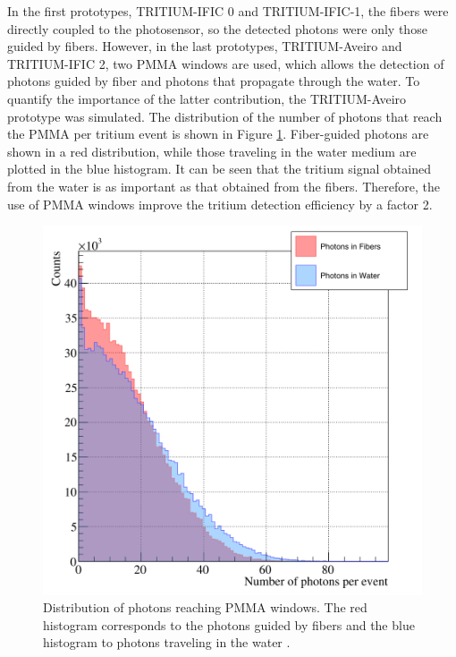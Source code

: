 In the first prototypes, TRITIUM-IFIC 0 and TRITIUM-IFIC-1, the fibers were directly coupled to the photosensor, so the detected photons were only those guided by fibers. However, in the last prototypes, TRITIUM-Aveiro and TRITIUM-IFIC 2, two PMMA windows are used, which allows the detection of photons guided by fiber and photons that propagate through the water. To quantify the importance of the latter contribution, the TRITIUM-Aveiro prototype was simulated. The distribution of the number of photons that reach the PMMA per tritium event is shown in Figure \ref{fig:PMMAEffect}. Fiber-guided photons are shown in a red distribution, while those traveling in the water medium are plotted in the blue histogram. It can be seen that the tritium signal obtained from the water is as important as that obtained from the fibers. Therefore, the use of PMMA windows improve the tritium detection efficiency by a factor 2.

\begin{figure}[hbtp]
\centering
\includegraphics[scale=0.3]{Figures/8SimulationsResults/81TRITIUMDesign/815PMMA/PhotonsDetectedWaterFiber.png}
\caption{Distribution of photons reaching PMMA windows. The red histogram corresponds to the photons guided by fibers and the blue histogram to photons traveling in the water \cite{SimulationPaperCarlos}.\label{fig:PMMAEffect}}
\end{figure}

